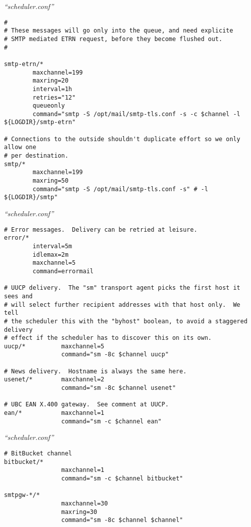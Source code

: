 \documentclass[a4paper,landscape]{slides}
\begin{document}
\begin{overlay}
\small
\centerline{{\it ``scheduler.conf''}}
\tiny
\begin{verbatim}
#
# These messages will go only into the queue, and need explicite
# SMTP mediated ETRN request, before they become flushed out.
#

smtp-etrn/*
        maxchannel=199
        maxring=20
        interval=1h
        retries="12"
        queueonly
        command="smtp -S /opt/mail/smtp-tls.conf -s -c $channel -l ${LOGDIR}/smtp-etrn"

# Connections to the outside shouldn't duplicate effort so we only allow one
# per destination.
smtp/*
        maxchannel=199
        maxring=50
        command="smtp -S /opt/mail/smtp-tls.conf -s" # -l ${LOGDIR}/smtp"
\end{verbatim}
\vfill
\end{overlay}
\begin{overlay}
\small
\centerline{{\it ``scheduler.conf''}}
\tiny
\begin{verbatim}
# Error messages.  Delivery can be retried at leisure.
error/*
        interval=5m
        idlemax=2m
        maxchannel=5
        command=errormail

# UUCP delivery.  The "sm" transport agent picks the first host it sees and
# will select further recipient addresses with that host only.  We tell
# the scheduler this with the "byhost" boolean, to avoid a staggered delivery
# effect if the scheduler has to discover this on its own.
uucp/*          maxchannel=5
                command="sm -8c $channel uucp"

# News delivery.  Hostname is always the same here.
usenet/*        maxchannel=2
                command="sm -8c $channel usenet"

# UBC EAN X.400 gateway.  See comment at UUCP.
ean/*           maxchannel=1
                command="sm -c $channel ean"
\end{verbatim}
\vfill
\end{overlay}
\begin{overlay}
\small
\centerline{{\it ``scheduler.conf''}}
\tiny
\begin{verbatim}
# BitBucket channel
bitbucket/*
                maxchannel=1
                command="sm -c $channel bitbucket"

smtpgw-*/*
                maxchannel=30
                maxring=30
                command="sm -8c $channel $channel"
\end{verbatim}
\vfill
\end{overlay}
\end{document}
